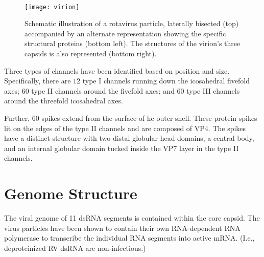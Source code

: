 \begin{figure}[htp]
\begin{center}
\\[1cm]
\texttt{[image: virion]}
\end{center}
\caption{Schematic illustration of a rotavirus particle, laterally bisected (top) accompanied by an alternate representation showing the specific structural proteins (bottom left). The structures of the virion's three capsids is also represented (bottom right).}
\label{fig01}
\end{figure}

Three types of channels have been identified based on position and size. Specifically, there are $12$ type I channels running down the icosahedral fivefold axes; 60 type II channels around the fivefold axes; and 60 type III channels around the threefold icosahedral axes.

Further, 60 spikes extend from the surface of he outer shell. These protein spikes lit on the edges of the type II channels and are composed of VP4. The spikes have a distinct structure with two distal globular head domains, a central body, and an internal globular domain tucked inside the VP7 layer in the type II channels.  

\section{Genome Structure}

The viral genome of 11 dsRNA segments is contained within the core capsid. The virus particles have been shown to contain their own RNA-dependent RNA polymerase to transcribe the individual RNA segments into active mRNA. (I.e., deproteinized RV dsRNA are non-infectious.)

